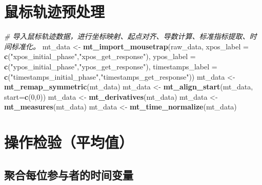 \documentclass[
]{article}
\newenvironment{Shaded}{\begin{snugshade}}{\end{snugshade}}
\newcommand{\AttributeTok}[1]{\textcolor[rgb]{0.13,0.29,0.53}{#1}}
\newcommand{\CommentTok}[1]{\textcolor[rgb]{0.56,0.35,0.01}{\textit{#1}}}
\newcommand{\DecValTok}[1]{\textcolor[rgb]{0.00,0.00,0.81}{#1}}
\newcommand{\FunctionTok}[1]{\textcolor[rgb]{0.13,0.29,0.53}{\textbf{#1}}}
\newcommand{\NormalTok}[1]{#1}
\newcommand{\OtherTok}[1]{\textcolor[rgb]{0.56,0.35,0.01}{#1}}
\newcommand{\StringTok}[1]{\textcolor[rgb]{0.31,0.60,0.02}{#1}}
\begin{document}
\section{鼠标轨迹预处理}\label{ux9f20ux6807ux8f68ux8ff9ux9884ux5904ux7406}

\begin{Shaded}
\begin{Highlighting}[]
\CommentTok{\# 导入鼠标轨迹数据，进行坐标映射、起点对齐、导数计算、标准指标提取、时间标准化。}
\NormalTok{mt\_data }\OtherTok{\textless{}{-}} \FunctionTok{mt\_import\_mousetrap}\NormalTok{(raw\_data,}
  \AttributeTok{xpos\_label =} \FunctionTok{c}\NormalTok{(}\StringTok{"xpos\_initial\_phase"}\NormalTok{,}\StringTok{"xpos\_get\_response"}\NormalTok{),}
  \AttributeTok{ypos\_label =} \FunctionTok{c}\NormalTok{(}\StringTok{"ypos\_initial\_phase"}\NormalTok{,}\StringTok{"ypos\_get\_response"}\NormalTok{),}
  \AttributeTok{timestamps\_label =} \FunctionTok{c}\NormalTok{(}\StringTok{"timestamps\_initial\_phase"}\NormalTok{,}\StringTok{"timestamps\_get\_response"}\NormalTok{))}
\NormalTok{mt\_data }\OtherTok{\textless{}{-}} \FunctionTok{mt\_remap\_symmetric}\NormalTok{(mt\_data)}
\NormalTok{mt\_data }\OtherTok{\textless{}{-}} \FunctionTok{mt\_align\_start}\NormalTok{(mt\_data, }\AttributeTok{start=}\FunctionTok{c}\NormalTok{(}\DecValTok{0}\NormalTok{,}\DecValTok{0}\NormalTok{))}
\NormalTok{mt\_data }\OtherTok{\textless{}{-}} \FunctionTok{mt\_derivatives}\NormalTok{(mt\_data)}
\NormalTok{mt\_data }\OtherTok{\textless{}{-}} \FunctionTok{mt\_measures}\NormalTok{(mt\_data)}
\NormalTok{mt\_data }\OtherTok{\textless{}{-}} \FunctionTok{mt\_time\_normalize}\NormalTok{(mt\_data)}
\end{Highlighting}
\end{Shaded}

\section{操作检验（平均值）}\label{ux64cdux4f5cux68c0ux9a8cux5e73ux5747ux503c}

\subsection{聚合每位参与者的时间变量}\label{ux805aux5408ux6bcfux4f4dux53c2ux4e0eux8005ux7684ux65f6ux95f4ux53d8ux91cf}
\end{document}
